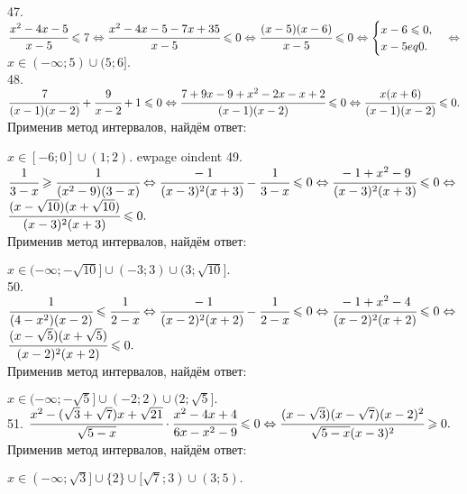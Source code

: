 47. $\cfrac{x^2-4x-5}{x-5}\leqslant 7\Leftrightarrow \cfrac{x^2-4x-5-7x+35}{x-5}\leqslant0 \Leftrightarrow \cfrac{(x-5)(x-6)}{x-5}\leqslant0
\Leftrightarrow \begin{cases}x-6\leqslant 0,\\ x-5
eq0.\end{cases}\Leftrightarrow$\\$ x\in (-\infty;5)\cup(5;6].$\\
48. $\cfrac{7}{(x-1)(x-2)}+\cfrac{9}{x-2}+1\leqslant0\Leftrightarrow \cfrac{7+9x-9+x^2-2x-x+2}{(x-1)(x-2)}\leqslant0
\Leftrightarrow \cfrac{x(x+6)}{(x-1)(x-2)}\leqslant0.$ Применив метод интервалов, найдём ответ:
\begin{figure}[ht!]
\end{figure}
$x\in[-6;0]\cup(1;2).$
ewpage
oindent
49. $\cfrac{1}{3-x}\geqslant\cfrac{1}{(x^2-9)(3-x)}\Leftrightarrow\cfrac{-1}{(x-3)^2(x+3)}-\cfrac{1}{3-x}\leqslant0\Leftrightarrow
\cfrac{-1+x^2-9}{(x-3)^2(x+3)}\leqslant0\Leftrightarrow$\\$\cfrac{(x-\sqrt{10})(x+\sqrt{10})}{(x-3)^2(x+3)}\leqslant0.$\\ Применив метод интервалов, найдём ответ:
\begin{figure}[ht!]
\end{figure}
$x\in(-\infty;-\sqrt{10}]\cup(-3;3)\cup(3;\sqrt{10}].$\\
50. $\cfrac{1}{(4-x^2)(x-2)}\leqslant\cfrac{1}{2-x} \Leftrightarrow\cfrac{-1}{(x-2)^2(x+2)}-\cfrac{1}{2-x}\leqslant0\Leftrightarrow
\cfrac{-1+x^2-4}{(x-2)^2(x+2)}\leqslant0\Leftrightarrow$\\$\cfrac{(x-\sqrt{5})(x+\sqrt{5})}{(x-2)^2(x+2)}\leqslant0.$\\ Применив метод интервалов, найдём ответ:
\begin{figure}[ht!]
\end{figure}
$x\in(-\infty;-\sqrt{5}]\cup(-2;2)\cup(2;\sqrt{5}].$\\
51. $\cfrac{x^2-(\sqrt{3}+\sqrt{7})x+\sqrt{21}}{\sqrt{5-x}}\cdot\cfrac{x^2-4x+4}{6x-x^2-9}\leqslant 0\Leftrightarrow
\cfrac{(x-\sqrt{3})(x-\sqrt{7})(x-2)^2}{\sqrt{5-x}(x-3)^2}\geqslant 0.$ Применив метод интервалов, найдём ответ:
\begin{figure}[ht!]
\end{figure}
$x\in(-\infty;\sqrt{3}]\cup\{2\}\cup[\sqrt{7};3)\cup(3;5).$\\

